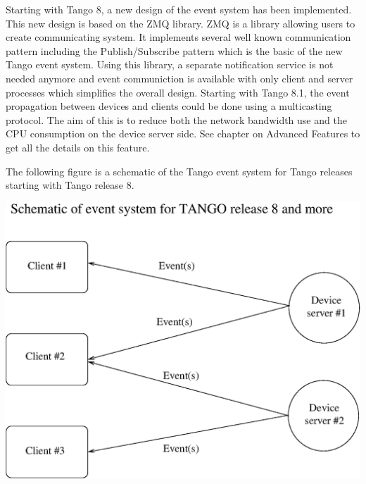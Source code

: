 Starting with Tango 8, a new design of the event system has been implemented.
This new design is based on the ZMQ library. ZMQ is a
library allowing users to create communicating system. It implements
several well known communication pattern including the Publish/Subscribe
pattern which is the basic of the new Tango event system. Using this
library, a separate notification service is not needed anymore and
event communiction is available with only client and server processes
which simplifies the overall design. Starting with Tango 8.1, the
event propagation between devices and clients could be done using
a multicasting protocol. The aim of this is to
reduce both the network bandwidth use and the CPU consumption on the
device server side. See chapter on Advanced Features to get all the
details on this feature.

The following figure is a schematic of the Tango event system for
Tango releases starting with Tango release 8.

\vspace{0.3cm}

\begin{center}
\includegraphics[bb=0bp 0bp 523bp 485bp,clip,scale=0.8]{ds_model/event_schematic_zmq}
\par\end{center}

\vspace{0.3cm}

